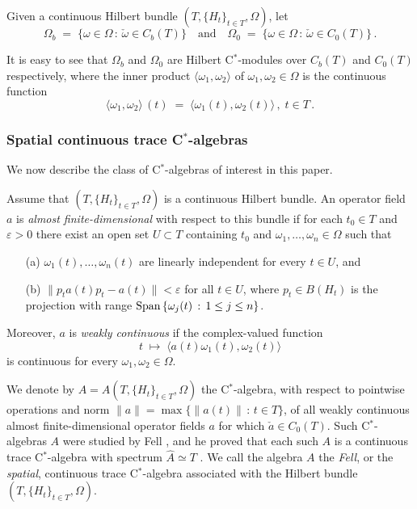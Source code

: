 \documentclass{amsart}
\theoremstyle{definition}
\theoremstyle{remark}
\begin{document}
Given a continuous Hilbert bundle $(T,\{H_t\}_{t\in T},\Omega)$, let
\begin{equation}\label{def Omega_0_b }
\Omega_b\;=\;\{\omega\in\Omega\,:\,\check{\omega}\in C_b(T)\} \quad\mbox{and}\quad
\Omega_0\;=\;\{\omega\in\Omega\,:\,\check{\omega}\in C_0(T)\} \,.
\end{equation}

It is easy to see that $\Omega_b$ and $\Omega_0$ are Hilbert C$^*$-modules over
$C_b(T)$ and $C_0(T)$ respectively, where the inner product $\langle\omega_1,\omega_2\rangle$
of $\omega_1,\omega_2\in\Omega$ is the continuous function
\[
\langle\omega_1,\omega_2\rangle\,(t)\;=\;\langle\omega_1(t),\omega_2(t)\rangle\,,\;t\in T\,.
\]

\subsubsection*{Spatial continuous trace C$^*$-algebras}

We now describe the class of C$^*$-algebras of interest in this paper.

Assume that $(T,\{H_t\}_{t\in T},\Omega)$
is a continuous Hilbert bundle.
An operator field $a$ is
\emph{almost finite-dimensional} with respect to this bundle
 if for each $t_0\in T$ and $\varepsilon>0$
       there exist an open set $U\subset T$ containing $t_0$
       and $\omega_1,\dots, \omega_n\in \Omega$ such that
          \begin{enumerate}
            \item[{(a)}] $\omega_1(t),\dots,\omega_n(t)$ are linearly independent for every $t\in U$, and
             \item[{(b)}] $\|p_ta(t)p_t-a(t)\|<\varepsilon$ for all $t\in U$, where $p_t\in B(H_t)$ is the
                         projection with range $\mbox{\rm Span}\,\{\omega_j(t)\,:\,1\le j\le n\}$.
          \end{enumerate}
 Moreover, $a$ is  \emph{weakly continuous} if the complex-valued function
\[
t\;\mapsto\;\langle a(t)\omega_1(t), \omega_2(t)\rangle
\]
is continuous for every $\omega_1,\omega_2\in\Omega$.

We denote by
$A=A(T,\{H_t\}_{t\in T},\Omega)$
the C$^*$-algebra,
with respect to pointwise operations and norm $\|a\|=\max\{\|a(t)\|\,:\,t\in T\}$, of
all weakly continuous almost finite-dimensional operator fields $a$ for which $\check{a}\in C_0(T)$.
Such C$^*$-algebras $A$
were studied by Fell \cite{fell1961}, and he proved that each such $A$
is a continuous trace C$^*$-algebra with spectrum $\hat A\simeq T$ \cite[Theorems 4.4, 4.5]{fell1961}.
We call the algebra $A$ the \emph{Fell}, or the \emph{spatial},
continuous trace C$^*$-algebra associated with the Hilbert bundle
$(T,\{H_t\}_{t\in T},\Omega)$.
\end{document}
